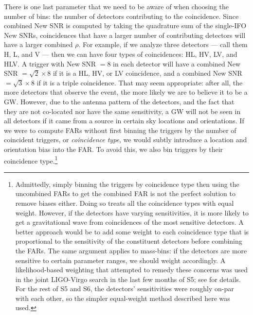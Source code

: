 There is one last parameter that we need to be aware of when choosing the number of bins: the number of detectors contributing to the coincidence. Since combined New \ac{SNR} is computed by taking the quadrature sum of the single-\ac{IFO} New \acp{SNR}, coincidences that have a larger number of contributing detectors will have a larger combined $\rho$. For example, if we analyze three detectors --- call them H, L, and V --- then we can have four types of coincidences: HL, HV, LV, and HLV. A trigger with New \ac{SNR} $= 8$ in each detector will have a combined New \ac{SNR} $= \sqrt{2}\times8$ if it is a HL, HV, or LV coincidence, and a combined New \ac{SNR} $= \sqrt{3}\times8$ if it is a triple coincidence. That may seem appropriate: after all, the more detectors that observe the event, the more likely we are to believe it to be a \ac{GW}. However, due to the antenna pattern of the detectors, and the fact that they are not co-located nor have the same sensitivity, a \ac{GW} will not be seen in all detectors if it came from a source in certain sky locations and orientations. If we were to compute \acp{FAR} without first binning the triggers by the number of coincident triggers, or \emph{coincidence type}, we would subtly introduce a location and orientation bias into the \ac{FAR}. To avoid this, we also bin triggers by their coincidence type.\footnote{Admittedly, simply binning the triggers by coincidence type then using the uncombined \acp{FAR} to get the combined \ac{FAR} is not the perfect solution to remove biases either. Doing so treats all the coincidence types with equal weight. However, if the detectors have varying sensitivities, it is more likely to get a gravitational wave from coincidences of the most sensitive detectors. A better approach would be to add some weight to each coincidence type that is proportional to the sensitivity of the constituent detectors before combining the \acp{FAR}. The same argument applies to mass-bins: if the detectors are more sensitive to certain parameter ranges, we should weight accordingly. A likelihood-based weighting that attempted to remedy these concerns was used in the joint LIGO-Virgo search in the last few months of \ac{S5}; see \cite{S5LowMassLV} for details. For the rest of \ac{S5} and \ac{S6}, the detectors' sensitivities were roughly on-par with each other, so the simpler equal-weight method described here was used.}


